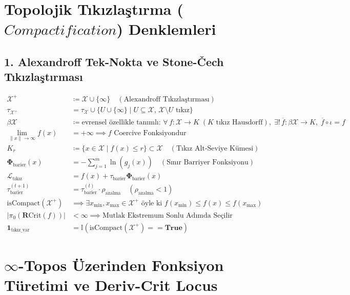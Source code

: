 \documentclass[11pt, a4paper]{article}
\begin{document}
\section{Topolojik Tıkızlaştırma ($Compactification$) Denklemleri}

\subsection{1. Alexandroff Tek-Nokta ve Stone-Čech Tıkızlaştırması}
\begin{align}
\mathcal{X}^+ &\coloneqq \mathcal{X} \cup \{ \infty \} \quad (\text{Alexandroff Tıkızlaştırması}) \\
\tau_{\mathcal{X}^+} &= \tau_{\mathcal{X}} \cup \{ U \cup \{ \infty \} \mid U \subseteq \mathcal{X}, \, \mathcal{X} \setminus U \text{ tıkız} \} \\
\beta\mathcal{X} &\coloneqq \text{evrensel özellikle tanımlı: } \forall\, f : \mathcal{X} \to K \;(K \text{ tıkız Hausdorff}), \;\exists!\, \overline{f} : \beta\mathcal{X} \to K, \; \overline{f} \circ \iota = f \\
\lim_{\|x\| \to \infty} f(x) &= +\infty \implies f \text{ Coercive Fonksiyondur} \\
K_r &\coloneqq \{ x \in \mathcal{X} \mid f(x) \le r \} \subset \mathcal{X} \quad (\text{Tıkız Alt-Seviye Kümesi}) \\
\mathbf{\Phi}_{\text{barier}}(x) &= -\sum_{j=1}^m \ln(g_j(x)) \quad (\text{Sınır Barriyer Fonksiyonu}) \\
\mathcal{L}_{\text{tıkız}} &= f(x) + \tau_{\text{barier}} \mathbf{\Phi}_{\text{barier}}(x) \\
\tau_{\text{barier}}^{(t+1)} &= \tau_{\text{barier}}^{(t)} \cdot \rho_{\text{azalma}} \quad (\rho_{\text{azalma}} < 1) \\
\text{isCompact}(\mathcal{X}^+) &\implies \exists x_{\min}, x_{\max} \in \mathcal{X}^+ \text{ öyle ki } f(x_{\min}) \le f(x) \le f(x_{\max}) \\
\left| \pi_0(\mathbf{R}\text{Crit}(f)) \right| &< \infty \implies \text{Mutlak Ekstremum Sonlu Adımda Seçilir} \\
\mathbf{1}_{\text{tıkız\_var}} &= \mathbb{I}(\text{isCompact}(\mathcal{X}^+) == \mathbf{True})
\end{align}

\section{$\infty$-Topos Üzerinden Fonksiyon Türetimi ve Deriv-Crit Locus}
\end{document}
